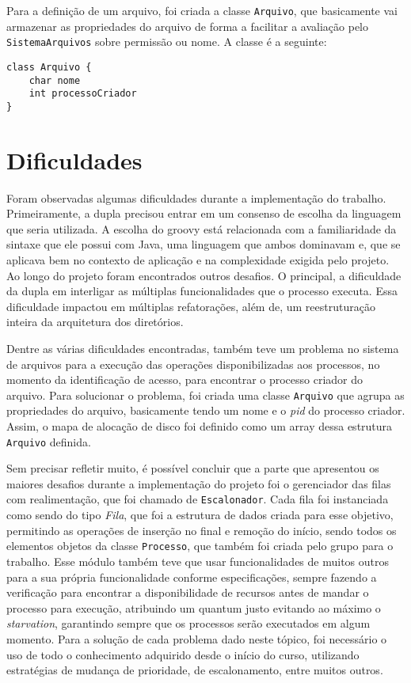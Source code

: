 \documentclass[12pt]{article}
\begin{document}
Para a definição de um arquivo, foi criada a classe \texttt{Arquivo}, que basicamente vai armazenar as propriedades do arquivo de forma a facilitar a avaliação pelo \texttt{SistemaArquivos} sobre permissão ou nome. A classe é a seguinte:

\begin{verbatim}
class Arquivo {
    char nome
    int processoCriador
}
\end{verbatim}

\section{Dificuldades}
Foram observadas algumas dificuldades durante a implementação do trabalho. Primeiramente, a dupla precisou entrar em um consenso de escolha da linguagem que seria utilizada. A escolha do groovy está relacionada com a familiaridade da sintaxe que ele possui com Java, uma linguagem que ambos dominavam e, que se aplicava bem no contexto de aplicação e na complexidade exigida pelo projeto. Ao longo do projeto foram encontrados outros desafios. O principal, a dificuldade da dupla em interligar as múltiplas funcionalidades que o processo executa. Essa dificuldade impactou em múltiplas refatorações, além de, um reestruturação inteira da arquitetura dos diretórios.

Dentre as várias dificuldades encontradas, também teve um problema no sistema de arquivos para a execução das operações disponibilizadas aos processos, no momento da identificação de acesso, para encontrar o processo criador do arquivo. Para solucionar o problema, foi criada uma classe \texttt{Arquivo} que agrupa as propriedades do arquivo, basicamente tendo um nome e o \textit{pid} do processo criador. Assim, o mapa de alocação de disco foi definido como um array dessa estrutura \texttt{Arquivo} definida.

Sem precisar refletir muito, é possível concluir que a parte que apresentou os maiores desafios durante a implementação do projeto foi o gerenciador das filas com realimentação, que foi chamado de \texttt{Escalonador}. Cada fila foi instanciada como sendo do tipo \textit{Fila}, que foi a estrutura de dados criada para esse objetivo, permitindo as operações de inserção no final e remoção do início, sendo todos os elementos objetos da classe \texttt{Processo}, que também foi criada pelo grupo para o trabalho. Esse módulo também teve que usar funcionalidades de muitos outros para a sua própria funcionalidade conforme especificações, sempre fazendo a verificação para encontrar a disponibilidade de recursos antes de mandar o processo para execução, atribuindo um quantum justo evitando ao máximo o \textit{starvation}, garantindo sempre que os processos serão executados em algum momento. Para a solução de cada problema dado neste tópico, foi necessário o uso de todo o conhecimento adquirido desde o início do curso, utilizando estratégias de mudança de prioridade, de escalonamento, entre muitos outros.
\end{document}
